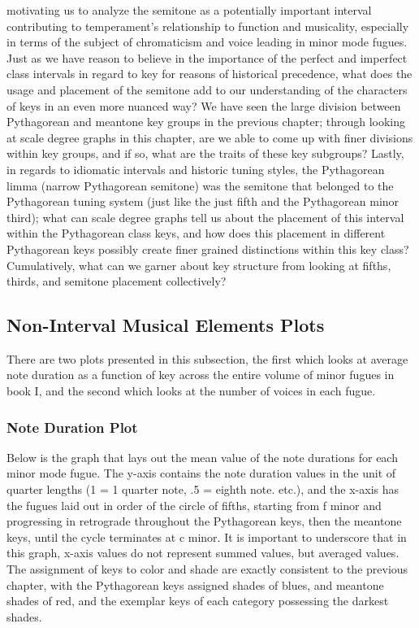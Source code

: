 \begin{enumerate}
  motivating us to analyze the semitone as a potentially important
  interval contributing to temperament's relationship to function and
  musicality, especially in terms of the subject of chromaticism and
  voice leading in minor mode fugues. Just as we have reason to believe
  in the importance of the perfect and imperfect class intervals in
  regard to key for reasons of historical precedence, what does the
  usage and placement of the semitone add to our understanding of the
  characters of keys in an even more nuanced way? We have seen the large
  division between Pythagorean and meantone key groups in the previous
  chapter; through looking at scale degree graphs in this chapter, are
  we able to come up with finer divisions within key groups, and if so,
  what are the traits of these key subgroups? Lastly, in regards to
  idiomatic intervals and historic tuning styles, the Pythagorean limma
  (narrow Pythagorean semitone) was the semitone that belonged to the
  Pythagorean tuning system (just like the just fifth and the
  Pythagorean minor third); what can scale degree graphs tell us about
  the placement of this interval within the Pythagorean class keys, and
  how does this placement in different Pythagorean keys possibly create
  finer grained distinctions within this key class? Cumulatively, what
  can we garner about key structure from looking at fifths, thirds, and
  semitone placement collectively?
\end{enumerate}

    \subsection{Non-Interval Musical Elements
Plots}\label{non-interval-musical-elements-plots}

There are two plots presented in this subsection, the first which looks
at average note duration as a function of key across the entire volume
of minor fugues in book I, and the second which looks at the number of
voices in each fugue.

    \subsubsection{Note Duration Plot}\label{note-duration-plot}

Below is the graph that lays out the mean value of the note durations
for each minor mode fugue. The y-axis contains the note duration values
in the unit of quarter lengths (1 = 1 quarter note, .5 = eighth note.
etc.), and the x-axis has the fugues laid out in order of the circle of
fifths, starting from f minor and progressing in retrograde throughout
the Pythagorean keys, then the meantone keys, until the cycle terminates
at c minor. It is important to underscore that in this graph, x-axis
values do not represent summed values, but averaged values. The
assignment of keys to color and shade are exactly consistent to the
previous chapter, with the Pythagorean keys assigned shades of blues,
and meantone shades of red, and the exemplar keys of each category
possessing the darkest shades.




